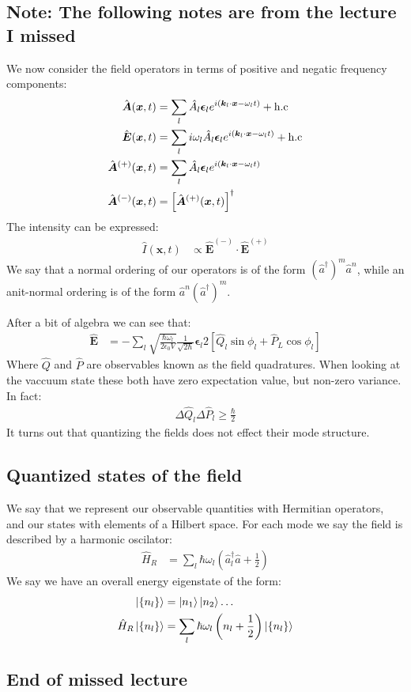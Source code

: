 \subsection*{Note: The following notes are from the lecture I missed}
We now consider the field operators in terms of positive and negatic frequency components:
\begin{align*}
	\hat{\bm{A}}(\bm{x},t) &= \sum_l \hat{A}_l \bm{\epsilon}_l e^{i(\bm{k}_l\cdot\bm{x} - \omega_l t)} + \text{h.c} \\
	\hat{\bm{E}}(\bm{x},t) &= \sum_l i\omega_l\hat{A}_l \bm{\epsilon}_l e^{i(\bm{k}_l\cdot\bm{x} - \omega_l t)} + \text{h.c} \\
	\hat{\bm{A}}^{(+)}(\bm{x},t) &= \sum_l \hat{A}_l \bm{\epsilon}_l e^{i(\bm{k}_l\cdot\bm{x} - \omega_l t)} \\
	\hat{\bm{A}}^{(-)}(\bm{x},t) &= \left[\hat{\bm{A}}^{(+)}(\bm{x},t)\right]^\dagger
\end{align*}
The intensity can be expressed:
\begin{align*}
	\hat{I}(\bm{x},t) &\propto \hat{\bm{E}}^{(-)}\cdot\hat{\bm{E}}^{(+)}
\end{align*}
We say that a normal ordering of our operators is of the form $(\hat{a}^\dagger)^m \hat{a}^n$, while an anit-normal ordering is of the form $\hat{a}^n(\hat{a}^\dagger)^m$.

After a bit of algebra we can see that:
\begin{align*}
	\hat{\bm{E}} &= - \sum_l \sqrt{\frac{\hbar\omega_l}{2\epsilon_0 V}} \frac{1}{\sqrt{2\hbar}} \bm{\epsilon}_l 2\left[\hat{Q}_l\sin\phi_l + \hat{P}_L\cos\phi_l\right]
\end{align*}
Where $\hat{Q}$ and $\hat{P}$ are observables known as the field quadratures. When looking at the vaccuum state these both have zero expectation value, but non-zero variance. In fact:
\begin{align*}
	\Delta \hat{Q}_l\Delta\hat{P}_l \geq \frac{\hbar}{2}
\end{align*}
It turns out that quantizing the fields does not effect their mode structure.
\subsection{Quantized states of the field}
We say that we represent our observable quantities with Hermitian operators, and our states with elements of a Hilbert space. For each mode we say the field is described by a harmonic oscilator:
\begin{align*}
	\hat{H}_R &= \sum_l \hbar\omega_l\left(\hat{a}_l^\dagger\hat{a} + \frac{1}{2}\right)
\end{align*}
We say we have an overall energy eigenstate of the form:
\begin{align*}
	\ket{\{n_l\}} &= \ket{n_1}\ket{n_2}\ldots \\
	\hat{H}_R\ket{\{n_l\}} &= \sum_l \hbar\omega_l\left(n_l + \frac{1}{2}\right)\ket{\{n_l\}}
\end{align*}
\subsection*{End of missed lecture}
